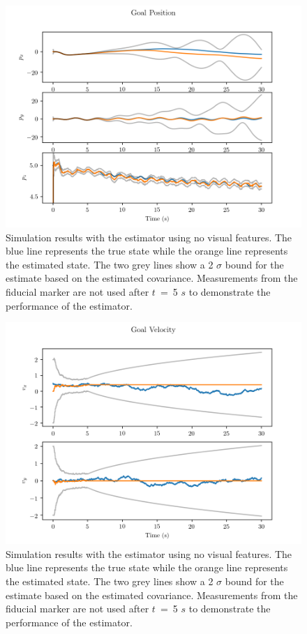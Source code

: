 \begin{figure}
  \centering
  \includegraphics[scale=0.5]{plots/no_lms_gp.png}
  \caption{Simulation results with the estimator using no visual
  features. The blue line represents the true state while the orange line
  represents the estimated state. The two grey lines show a 2 $\sigma$ bound for
  the estimate based on the estimated covariance. Measurements from the fiducial
  marker are not used after $t$~=~5
$s$ to demonstrate the performance of the estimator.}
  \label{fig:no_lms_gp}
\end{figure}

\begin{figure}
  \centering
  \includegraphics[scale=0.5]{plots/no_lms_gv.png}
  \caption{Simulation results with the estimator using no visual
  features. The blue line represents the true state while the orange line
  represents the estimated state. The two grey lines show a 2 $\sigma$ bound for
  the estimate based on the estimated covariance. Measurements from the fiducial
  marker are not used after $t$~=~5
$s$ to demonstrate the performance of the estimator.}
  \label{fig:no_lms_gv}
\end{figure}


